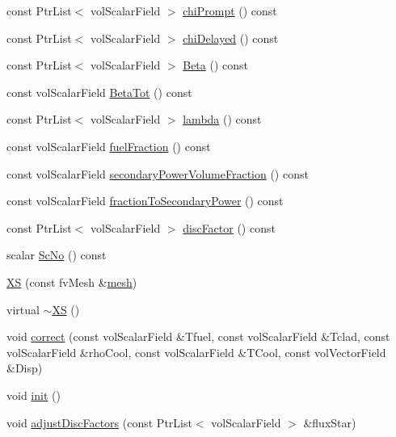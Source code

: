 \begin{DoxyCompactItemize}
\item 
const Ptr\+List$<$ vol\+Scalar\+Field $>$ \hyperlink{classFoam_1_1XS_a3a5e5dc25bec8fab86781d7eb546a92f}{chi\+Prompt} () const
\item 
const Ptr\+List$<$ vol\+Scalar\+Field $>$ \hyperlink{classFoam_1_1XS_a8453995c1f390f686ffb8d0f3fd639c6}{chi\+Delayed} () const
\item 
const Ptr\+List$<$ vol\+Scalar\+Field $>$ \hyperlink{classFoam_1_1XS_a18490f453da25d7d0de6e64d27566fe5}{Beta} () const
\item 
const vol\+Scalar\+Field \hyperlink{classFoam_1_1XS_aa96d596b47a6028287270cfd82bed41f}{Beta\+Tot} () const
\item 
const Ptr\+List$<$ vol\+Scalar\+Field $>$ \hyperlink{classFoam_1_1XS_a9fe5da186e1af8ac5b1a3adff2686609}{lambda} () const
\item 
const vol\+Scalar\+Field \hyperlink{classFoam_1_1XS_a3d14d73bfcd0223e7a1c79a407611517}{fuel\+Fraction} () const
\item 
const vol\+Scalar\+Field \hyperlink{classFoam_1_1XS_a52899ae5805771cf443d9a7e6ba81dc5}{secondary\+Power\+Volume\+Fraction} () const
\item 
const vol\+Scalar\+Field \hyperlink{classFoam_1_1XS_aa8387c8a487d8285a32ef61af121e35e}{fraction\+To\+Secondary\+Power} () const
\item 
const Ptr\+List$<$ vol\+Scalar\+Field $>$ \hyperlink{classFoam_1_1XS_a37492f221b3e42a24a81a6defba591fc}{disc\+Factor} () const
\item 
scalar \hyperlink{classFoam_1_1XS_a35ef675ab2b1fab8ba01a2fc817df427}{Sc\+No} () const
\item 
\hyperlink{classFoam_1_1XS_a5dcffd55a0e6d9328ac35d8195ad4b4f}{XS} (const fv\+Mesh \&\hyperlink{createMeshesPostProcess_8H_a8bb1e58291d2d2b653e024a4f4bffe38}{mesh})
\item 
virtual \hyperlink{classFoam_1_1XS_ad91a4085b47550ac2d047e2a2042abfe}{$\sim$\+XS} ()
\item 
void \hyperlink{classFoam_1_1XS_adea4123ce2829dffe4bcf6104a52e8a7}{correct} (const vol\+Scalar\+Field \&Tfuel, const vol\+Scalar\+Field \&Tclad, const vol\+Scalar\+Field \&rho\+Cool, const vol\+Scalar\+Field \&T\+Cool, const vol\+Vector\+Field \&Disp)
\item 
void \hyperlink{classFoam_1_1XS_a02fd73d861ef2e4aabb38c0c9ff82947}{init} ()
\item 
void \hyperlink{classFoam_1_1XS_af611217ca3fa489260d3f17c7b29f71d}{adjust\+Disc\+Factors} (const Ptr\+List$<$ vol\+Scalar\+Field $>$ \&flux\+Star)
\end{DoxyCompactItemize}
